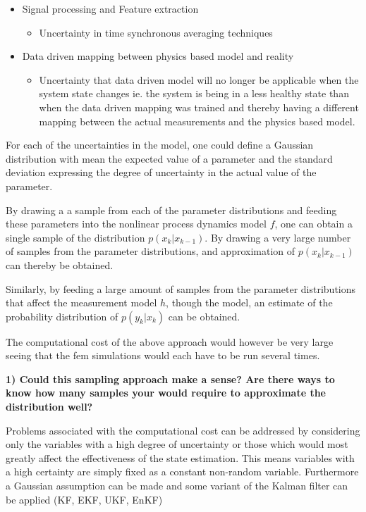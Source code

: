 \begin{itemize}
\begin{itemize}
	\end{itemize}
	\item Signal processing and Feature extraction
		\begin{itemize}
		\item Uncertainty in time synchronous averaging techniques
		\end{itemize}
	\item Data driven mapping between physics based model and reality
		\begin{itemize}
		\item Uncertainty that data driven model will no longer be applicable when the system state changes ie. the system is being in a less healthy state than when the data driven mapping was trained and thereby having a different mapping between the actual measurements and the physics based model.
		\end{itemize}
\end{itemize}


For each of the uncertainties in the model, one could define a Gaussian distribution with mean the expected value of a parameter and the standard deviation expressing the degree of uncertainty in the actual value of the parameter. 

By drawing a a sample from each of the parameter distributions and feeding these parameters into the nonlinear process dynamics model $f$, one can obtain a single sample of the distribution $p\left(x_{k} | x_{k-1}\right)$. By drawing a very large number of samples from the parameter distributions, and approximation of $p\left(x_{k} | x_{k-1}\right)$ can thereby be obtained.

Similarly, by feeding a large amount of samples from the parameter distributions that affect the measurement model $h$, though the model, an estimate of the probability distribution of $p\left(y_{k} | x_{k}\right)$ can be obtained.

The computational cost of the above approach would however be very large seeing that the fem simulations would each have to be run several times.

\textbf{1) Could this sampling approach make a sense? Are there ways to know how many samples your would require to approximate the distribution well?}

Problems associated with the computational cost  can be addressed by considering only the variables with a high degree of uncertainty or those which would most greatly affect the effectiveness of the state estimation. This means variables with a high certainty are simply fixed as a constant non-random variable. Furthermore a Gaussian assumption can be made and some variant of the Kalman filter can be applied (KF, EKF, UKF, EnKF)

